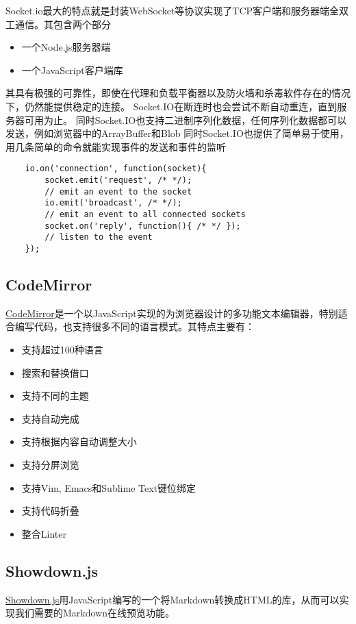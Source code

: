 \documentclass[11pt]{ctexart}
\begin{document}
Socket.io最大的特点就是封装WebSocket等协议实现了TCP客户端和服务器端全双工通信。其包含两个部分
\begin{itemize}
	\item 一个Node.js服务器端
	\item 一个JavaScript客户端库
\end{itemize}
其具有极强的可靠性，即使在代理和负载平衡器以及防火墙和杀毒软件存在的情况下，仍然能提供稳定的连接。
Socket.IO在断连时也会尝试不断自动重连，直到服务器可用为止。
同时Socket.IO也支持二进制序列化数据，任何序列化数据都可以发送，例如浏览器中的ArrayBuffer和Blob
同时Socket.IO也提供了简单易于使用，用几条简单的命令就能实现事件的发送和事件的监听
\begin{verbatim}
    io.on('connection', function(socket){
        socket.emit('request', /* */);
        // emit an event to the socket
        io.emit('broadcast', /* */);
        // emit an event to all connected sockets
        socket.on('reply', function(){ /* */ }); 
        // listen to the event
    });
\end{verbatim}
\subsection{CodeMirror}
\href{http://codemirror.net/}{CodeMirror}是一个以JavaScript实现的为浏览器设计的多功能文本编辑器，特别适合编写代码，也支持很多不同的语言模式。其特点主要有：
\begin{itemize}
	\item 支持超过100种语言
	\item 搜索和替换借口
	\item 支持不同的主题
	\item 支持自动完成
	\item 支持根据内容自动调整大小
	\item 支持分屏浏览
	\item 支持Vim, Emacs和Sublime Text键位绑定
	\item 支持代码折叠
	\item 整合Linter 
\end{itemize}
\subsection{Showdown.js}
\href{http://showdownjs.com/}{Showdown.js}用JavaScript编写的一个将Markdown转换成HTML的库，从而可以实现我们需要的Markdown在线预览功能。
\end{document}
